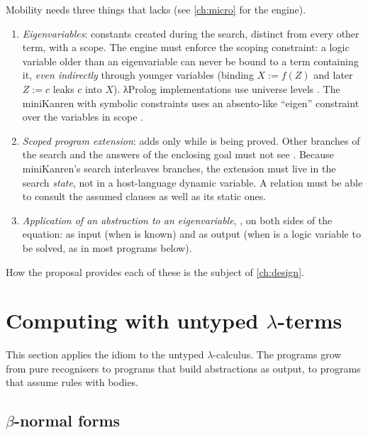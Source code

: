 {{\begin{kanren}
Mobility needs three things that \micro{} lacks (see \cref{ch:micro} for the engine).
\begin{enumerate}[nosep]
  \item \emph{Eigenvariables}: constants created during the search, distinct from every other term, with a
        scope. The engine must enforce the scoping constraint: a logic variable older than an eigenvariable
        can never be bound to a term containing it, \emph{even indirectly} through younger variables (binding
        $X:=f(Z)$ and later $Z:=c$ leaks $c$ into $X$). λProlog implementations use universe levels
        \cite{NadathurJayaramanKwon1995}. The miniKanren with symbolic constraints uses an absento-like
        \enquote{eigen} constraint over the variables in scope \cite{HemannByrdFriedman2013}.
  \item \emph{Scoped program extension}:  adds  only while  is being proved. Other branches
        of the search and the answers of the enclosing goal must not see . Because miniKanren's search
        interleaves branches, the extension must live in the search \emph{state}, not in a host-language
        dynamic variable. A relation must be able to consult the assumed clauses as well as its static ones.
  \item \emph{Application of an abstraction to an eigenvariable}, , on both sides of the equation:
        as input (when  is known) and as output (when  is a logic variable to be solved, as in most
        programs below).
\end{enumerate}
How the proposal provides each of these is the subject of \cref{ch:design}.
\end{kanren}

\section{Computing with untyped \texorpdfstring{$\lambda$}{λ}-terms}\label{sec:lambdatree-untyped-comp}

This section applies the idiom to the untyped $\lambda$-calculus. The programs grow from pure recognisers
to programs that build abstractions as output, to programs that assume rules with bodies.

\subsection{\texorpdfstring{$\beta$}{β}-normal forms}\label{sec:lambdatree-bnorm}

}}

